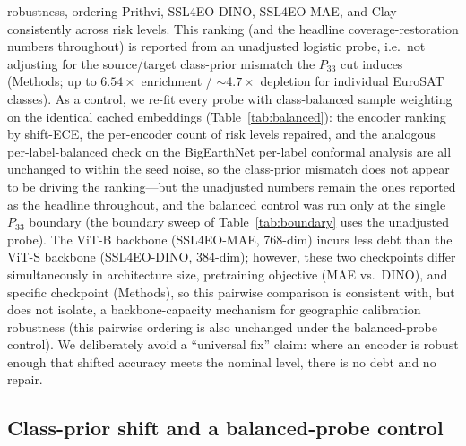\documentclass[11pt]{article}
\begin{document}
robustness, ordering Prithvi, SSL4EO-DINO, SSL4EO-MAE, and Clay consistently across risk levels. This ranking
(and the headline coverage-restoration numbers throughout) is
reported from an unadjusted logistic probe, i.e.\ not adjusting for the source/target class-prior
mismatch the $P_{33}$ cut induces (Methods; up to $6.54\times$ enrichment / $\sim\!4.7\times$ depletion for
individual EuroSAT classes). As a control, we re-fit every probe with class-balanced sample weighting on
the identical cached embeddings (Table~\ref{tab:balanced}): the encoder ranking by shift-ECE, the
per-encoder count of risk levels repaired, and the analogous per-label-balanced check on the BigEarthNet
per-label conformal analysis are all unchanged to within the seed noise, so the class-prior mismatch does not
appear to be driving the ranking---but the unadjusted numbers remain the ones reported as the headline
throughout, and the balanced control was run only at the single $P_{33}$ boundary (the boundary sweep of
Table~\ref{tab:boundary} uses the unadjusted probe). The ViT-B backbone (SSL4EO-MAE, 768-dim) incurs less debt than
the ViT-S backbone (SSL4EO-DINO, 384-dim); however, these two checkpoints differ simultaneously in
architecture size, pretraining objective (MAE vs.\ DINO), and specific checkpoint (Methods), so this
pairwise comparison is consistent with, but does not isolate, a backbone-capacity mechanism for geographic
calibration robustness (this pairwise ordering is also unchanged under the balanced-probe control). We
deliberately avoid a ``universal fix'' claim: where an encoder is robust
enough that shifted accuracy meets the nominal level, there is no debt and no repair.

\subsection{Class-prior shift and a balanced-probe control}
\end{document}
